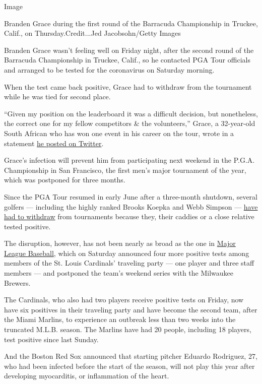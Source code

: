 Image

Branden Grace during the first round of the Barracuda Championship in
Truckee, Calif., on Thursday.Credit...Jed Jacobsohn/Getty Images

Branden Grace wasn't feeling well on Friday night, after the second
round of the Barracuda Championship in Truckee, Calif., so he contacted
PGA Tour officials and arranged to be tested for the coronavirus on
Saturday morning.

When the test came back positive, Grace had to withdraw from the
tournament while he was tied for second place.

``Given my position on the leaderboard it was a difficult decision, but
nonetheless, the correct one for my fellow competitors \& the
volunteers,'' Grace, a 32-year-old South African who has won one event
in his career on the tour, wrote in a statement
\href{https://twitter.com/BrandenGrace/status/1289689928180404230?s=20}{he
posted on Twitter}.

Grace's infection will prevent him from participating next weekend in
the P.G.A. Championship in San Francisco, the first men's major
tournament of the year, which was postponed for three months.

Since the PGA Tour resumed in early June after a three-month shutdown,
several golfers --- including the highly ranked Brooks Koepka and Webb
Simpson ---
\href{https://www.nytimes.com/2020/06/26/sports/golf/pga-golfer-positive-tests.html}{have
had to withdraw} from tournaments because they, their caddies or a close
relative tested positive.

The disruption, however, has not been nearly as broad as the one in
\href{https://www.nytimes.com/2020/08/01/sports/baseball/coronavirus-cardinals.html}{Major
League Baseball}, which on Saturday announced four more positive tests
among members of the St. Louis Cardinals' traveling party --- one player
and three staff members --- and postponed the team's weekend series with
the Milwaukee Brewers.

The Cardinals, who also had two players receive positive tests on
Friday, now have six positives in their traveling party and have become
the second team, after the Miami Marlins, to experience an outbreak less
than two weeks into the truncated M.L.B. season. The Marlins have had 20
people, including 18 players, test positive since last Sunday.

And the Boston Red Sox announced that starting pitcher Eduardo
Rodriguez, 27, who had been infected before the start of the season,
will not play this year after developing myocarditis, or inflammation of
the heart.

